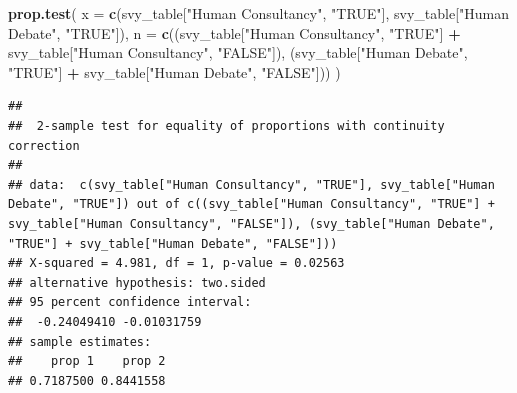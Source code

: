 \documentclass[
]{article}
\newenvironment{Shaded}{\begin{snugshade}}{\end{snugshade}}
\newcommand{\AttributeTok}[1]{\textcolor[rgb]{0.13,0.29,0.53}{#1}}
\newcommand{\FunctionTok}[1]{\textcolor[rgb]{0.13,0.29,0.53}{\textbf{#1}}}
\newcommand{\NormalTok}[1]{#1}
\newcommand{\SpecialCharTok}[1]{\textcolor[rgb]{0.81,0.36,0.00}{\textbf{#1}}}
\newcommand{\StringTok}[1]{\textcolor[rgb]{0.31,0.60,0.02}{#1}}
\begin{document}
\begin{Shaded}
\begin{Highlighting}[]
\FunctionTok{prop.test}\NormalTok{(}
      \AttributeTok{x =} \FunctionTok{c}\NormalTok{(svy\_table[}\StringTok{"Human Consultancy"}\NormalTok{, }\StringTok{"TRUE"}\NormalTok{], svy\_table[}\StringTok{"Human Debate"}\NormalTok{, }\StringTok{"TRUE"}\NormalTok{]),}
      \AttributeTok{n =} \FunctionTok{c}\NormalTok{((svy\_table[}\StringTok{"Human Consultancy"}\NormalTok{, }\StringTok{"TRUE"}\NormalTok{] }\SpecialCharTok{+}\NormalTok{ svy\_table[}\StringTok{"Human Consultancy"}\NormalTok{, }\StringTok{"FALSE"}\NormalTok{]), (svy\_table[}\StringTok{"Human Debate"}\NormalTok{, }\StringTok{"TRUE"}\NormalTok{] }\SpecialCharTok{+}\NormalTok{ svy\_table[}\StringTok{"Human Debate"}\NormalTok{, }\StringTok{"FALSE"}\NormalTok{]))}
\NormalTok{    )}
\end{Highlighting}
\end{Shaded}

\begin{verbatim}
## 
##  2-sample test for equality of proportions with continuity correction
## 
## data:  c(svy_table["Human Consultancy", "TRUE"], svy_table["Human Debate", "TRUE"]) out of c((svy_table["Human Consultancy", "TRUE"] + svy_table["Human Consultancy", "FALSE"]), (svy_table["Human Debate", "TRUE"] + svy_table["Human Debate", "FALSE"]))
## X-squared = 4.981, df = 1, p-value = 0.02563
## alternative hypothesis: two.sided
## 95 percent confidence interval:
##  -0.24049410 -0.01031759
## sample estimates:
##    prop 1    prop 2 
## 0.7187500 0.8441558
\end{verbatim}
\end{document}
